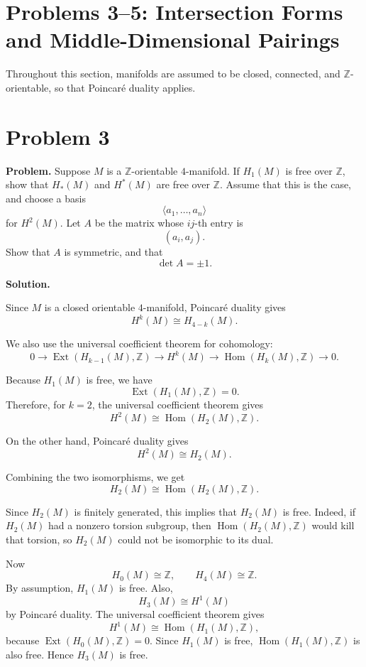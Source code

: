 \documentclass[12pt,a4paper]{article}
\theoremstyle{notespace}
\begin{document}
\section{Problems 3--5: Intersection Forms and Middle-Dimensional Pairings}

Throughout this section, manifolds are assumed to be closed, connected, and
\(\mathbb Z\)-orientable, so that Poincaré duality applies.

\section{Problem 3}

\textbf{Problem.}
Suppose \(M\) is a \(\mathbb Z\)-orientable \(4\)-manifold. If \(H_1(M)\) is free over
\(\mathbb Z\), show that \(H_*(M)\) and \(H^*(M)\) are free over \(\mathbb Z\).
Assume that this is the case, and choose a basis
\[
\langle a_1,\ldots,a_n\rangle
\]
for \(H^2(M)\). Let \(A\) be the matrix whose \(ij\)-th entry is
\[
(a_i,a_j).
\]
Show that \(A\) is symmetric, and that
\[
\det A=\pm 1.
\]

\medskip

\noindent\textbf{Solution.}

Since \(M\) is a closed orientable \(4\)-manifold, Poincaré duality gives
\[
H^k(M)\cong H_{4-k}(M).
\]

We also use the universal coefficient theorem for cohomology:
\[
0\longrightarrow \operatorname{Ext}(H_{k-1}(M),\mathbb Z)
\longrightarrow H^k(M)
\longrightarrow \operatorname{Hom}(H_k(M),\mathbb Z)
\longrightarrow 0.
\]

Because \(H_1(M)\) is free, we have
\[
\operatorname{Ext}(H_1(M),\mathbb Z)=0.
\]
Therefore, for \(k=2\), the universal coefficient theorem gives
\[
H^2(M)\cong \operatorname{Hom}(H_2(M),\mathbb Z).
\]

On the other hand, Poincaré duality gives
\[
H^2(M)\cong H_2(M).
\]

Combining the two isomorphisms, we get
\[
H_2(M)\cong \operatorname{Hom}(H_2(M),\mathbb Z).
\]

Since \(H_2(M)\) is finitely generated, this implies that \(H_2(M)\) is free. Indeed,
if \(H_2(M)\) had a nonzero torsion subgroup, then
\(\operatorname{Hom}(H_2(M),\mathbb Z)\) would kill that torsion, so
\(H_2(M)\) could not be isomorphic to its dual.

Now
\[
H_0(M)\cong \mathbb Z,
\qquad
H_4(M)\cong \mathbb Z.
\]
By assumption, \(H_1(M)\) is free. Also,
\[
H_3(M)\cong H^1(M)
\]
by Poincaré duality. The universal coefficient theorem gives
\[
H^1(M)\cong \operatorname{Hom}(H_1(M),\mathbb Z),
\]
because \(\operatorname{Ext}(H_0(M),\mathbb Z)=0\). Since \(H_1(M)\) is free,
\(\operatorname{Hom}(H_1(M),\mathbb Z)\) is also free. Hence \(H_3(M)\) is free.
\end{document}
